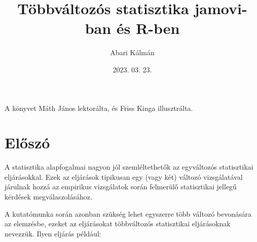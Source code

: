 \documentclass[
  letterpaper,
]{krantz}
\title{Többváltozós statisztika jamovi-ban és R-ben}
\author{Abari Kálmán}
\date{2023. 03. 23.}
\renewcommand*\contentsname{Tartalomjegyzék}
\newcommand\contentsname{Tartalomjegyzék}
\begin{document}
\maketitle

\thispagestyle{empty}

\begin{center}
A könyvet Máth János lektorálta, és Friss Kinga illusztrálta.
\end{center}

\setlength{\abovedisplayskip}{-5pt}
\setlength{\abovedisplayshortskip}{-5pt}


\ifdefined\Shaded\renewenvironment{Shaded}{\begin{tcolorbox}[enhanced, breakable, borderline west={3pt}{0pt}{shadecolor}, interior hidden, boxrule=0pt, sharp corners, frame hidden]}{\end{tcolorbox}}\fi

\renewcommand*\contentsname{Tartalomjegyzék}
{
\hypersetup{linkcolor=}
\setcounter{tocdepth}{2}
\tableofcontents
}
\listoffigures
\listoftables
{}

\hypertarget{sec-eloszo}{%
\chapter*{Előszó}\label{sec-eloszo}}


A statisztika alapfogalmai nagyon jól szemléltethetők az egyváltozós
statisztikai eljárásokkal. Ezek az eljárások tipikusan egy (vagy két)
változó vizsgálatával járulnak hozzá az empirikus vizsgálatok során
felmerülő statisztikai jellegű kérdések megválaszolásához.

A kutatómunka során azonban szükség lehet egyszerre több változó
bevonására az elemzésbe, ezeket az eljárásokat többváltozós statisztikai
eljárásoknak nevezzük. Ilyen eljárás például:
\end{document}
